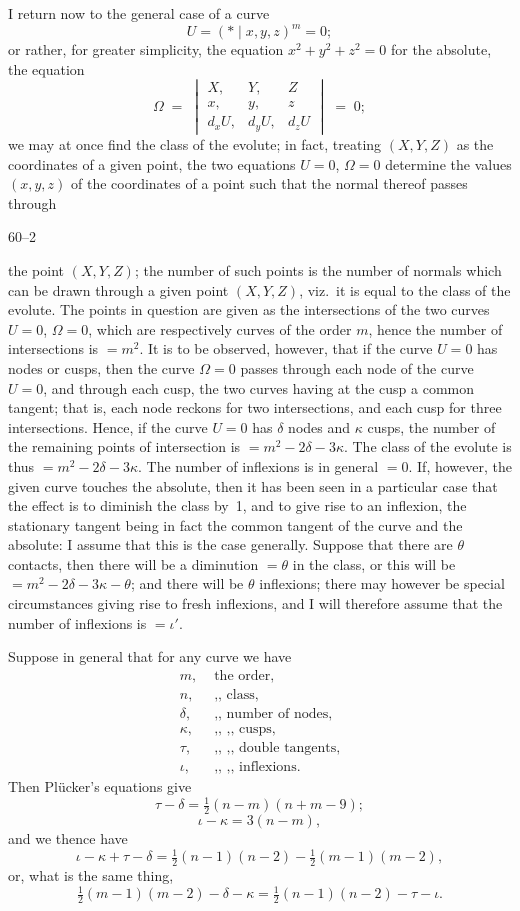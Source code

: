 \documentclass[11pt]{article}
\begin{document}
I return now to the general case of a curve
\[
U = (* \mid x,y,z)^{m} = 0;
\]
or rather, for greater simplicity, the equation $x^{2}+y^{2}+z^{2}=0$ for the absolute, the equation
\[
\Omega \;=\; \begin{vmatrix} X, & Y, & Z \\ x, & y, & z \\ d_{x}U, & d_{y}U, & d_{z}U \end{vmatrix} \;=\; 0;
\]
we may at once find the class of the evolute; in fact, treating $(X,Y,Z)$ as the coordinates of a given point, the two equations $U=0$, $\Omega=0$ determine the values $(x,y,z)$ of the coordinates of a point such that the normal thereof passes through

\hfill 60--2

\bigskip

\noindent the point $(X,Y,Z)$; the number of such points is the number of normals which can be drawn through a given point $(X,Y,Z)$, viz.\ it is equal to the class of the evolute. The points in question are given as the intersections of the two curves $U=0$, $\Omega=0$, which are respectively curves of the order $m$, hence the number of intersections is $=m^{2}$. It is to be observed, however, that if the curve $U=0$ has nodes or cusps, then the curve $\Omega=0$ passes through each node of the curve $U=0$, and through each cusp, the two curves having at the cusp a common tangent; that is, each node reckons for two intersections, and each cusp for three intersections. Hence, if the curve $U=0$ has $\delta$ nodes and $\kappa$ cusps, the number of the remaining points of intersection is $=m^{2}-2\delta-3\kappa$. The class of the evolute is thus $=m^{2}-2\delta-3\kappa$. The number of inflexions is in general $=0$. If, however, the given curve touches the absolute, then it has been seen in a particular case that the effect is to diminish the class by~1, and to give rise to an inflexion, the stationary tangent being in fact the common tangent of the curve and the absolute: I assume that this is the case generally. Suppose that there are $\theta$ contacts, then there will be a diminution $=\theta$ in the class, or this will be $=m^{2}-2\delta-3\kappa-\theta$; and there will be $\theta$ inflexions; there may however be special circumstances giving rise to fresh inflexions, and I will therefore assume that the number of inflexions is $=\iota'$.

Suppose in general that for any curve we have
\begin{align*}
m, &\text{ the order,}\\
n, &\text{ ,, class,}\\
\delta, &\text{ ,, number of nodes,}\\
\kappa, &\text{ ,, ,, cusps,}\\
\tau, &\text{ ,, ,, double tangents,}\\
\iota, &\text{ ,, ,, inflexions.}
\end{align*}
Then Pl\"ucker's equations give
\[
\tau - \delta = \tfrac{1}{2}(n-m)(n+m-9);
\]
\[
\iota - \kappa = 3(n-m),
\]
and we thence have
\[
\iota - \kappa + \tau - \delta = \tfrac{1}{2}(n-1)(n-2) - \tfrac{1}{2}(m-1)(m-2),
\]
or, what is the same thing,
\[
\tfrac{1}{2}(m-1)(m-2) - \delta - \kappa = \tfrac{1}{2}(n-1)(n-2) - \tau - \iota.
\]
\end{document}
